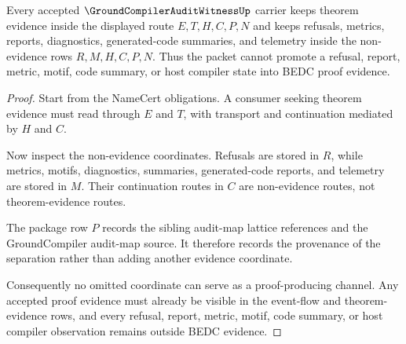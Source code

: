 \begin{theorem}
\label{thm:groundcompiler-audit-witness-evidence-nonescape}
Every accepted $\GroundCompilerAuditWitnessUp$ carrier keeps theorem evidence inside the displayed route $E,T,H,C,P,N$ and keeps refusals, metrics, reports, diagnostics, generated-code summaries, and telemetry inside the non-evidence rows $R,M,H,C,P,N$. Thus the packet cannot promote a refusal, report, metric, motif, code summary, or host compiler state into BEDC proof evidence.
\end{theorem}
\begin{proof}
Start from the NameCert obligations. A consumer seeking theorem evidence must read through $E$ and $T$, with transport and continuation mediated by $H$ and $C$.

Now inspect the non-evidence coordinates. Refusals are stored in $R$, while metrics, motifs, diagnostics, summaries, generated-code reports, and telemetry are stored in $M$. Their continuation routes in $C$ are non-evidence routes, not theorem-evidence routes.

The package row $P$ records the sibling audit-map lattice references and the GroundCompiler audit-map source. It therefore records the provenance of the separation rather than adding another evidence coordinate.

Consequently no omitted coordinate can serve as a proof-producing channel. Any accepted proof evidence must already be visible in the event-flow and theorem-evidence rows, and every refusal, report, metric, motif, code summary, or host compiler observation remains outside BEDC evidence.
\end{proof}


\begin{closurestatus}{\GroundCompilerAuditWitnessUp}
  \theoryclosure{\seedClosure}
  \formalstatus{\unformalizedV}
\end{closurestatus}
